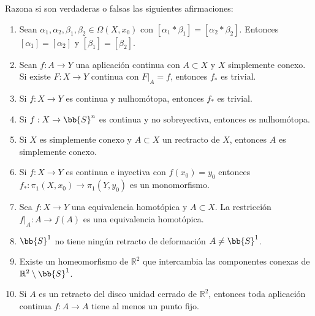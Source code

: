 \begin{ejercicio}
    Razona si son verdaderas o falsas las siguientes afirmaciones:
    \begin{enumerate}[label=\alph*)]
        \item Sean $\alpha_1,\alpha_2,\beta_1,\beta_2\in \Omega(X,x_0)$  con $[\alpha_1\ast \beta_1] = [\alpha_2\ast \beta_2]$. Entonces $[\alpha_1] = [\alpha_2]$ y $[\beta_1] = [\beta_2]$.
        \item Sean $f:A\to Y$ una aplicación continua con $A\subset X$ y $X$ simplemente conexo. Si existe $F:X\to Y$ continua con $F\big|_A = f$, entonces $f_\ast$ es trivial.
        \item Si $f:X\to Y$ es continua y nulhomótopa, entonces $f_\ast$ es trivial.
        \item Si $f:X\to \bb{S}^n$ es continua y no sobreyectiva, entonces es nulhomótopa.
        \item Si $X$ es simplemente conexo y $A\subset X$ un rectracto de $X$, entonces $A$ es simplemente conexo.
        \item Si $f:X\to Y$ es continua e inyectiva con $f(x_0)=y_0$ entonces $f_\ast:\pi_1(X,x_0)\to \pi_1(Y,y_0)$ es un monomorfismo.
        \item Sea $f:X\to Y$ una equivalencia homotópica y $A\subset X$. La restricción $f\big|_A:A\to f(A)$ es una equivalencia homotópica.
        \item $\bb{S}^1$ no tiene ningún retracto de deformación $A\neq \bb{S}^1$.
        \item Existe un homeomorfismo de $\mathbb{R}^2$ que intercambia las componentes conexas de $\mathbb{R}^2\setminus \bb{S}^1$.
        \item Si $A$ es un retracto del disco unidad cerrado de $\mathbb{R}^2$, entonces toda aplicación continua $f:A\to A$ tiene al menos un punto fijo.
    \end{enumerate}
\end{ejercicio}
